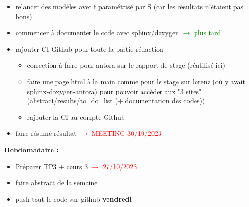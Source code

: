 \begin{itemize}[label=$\square$]
	\item[\done] relancer des modèles avec f paramétrisé par S (car les résultats n'étaient pas bons)
	\item[\wontfix] commencer à documenter le code avec sphinx/doxygen  \textcolor{Green}{$\rightarrow$ plus tard}
	\item[\done] rajouter CI Github pour toute la partie rédaction
	\begin{itemize}[label=\LARGE $\circ$]
		\item[\sdone] correction à faire pour antora sur le rapport de stage (réutilisé ici)
		\item[\swontfix] faire une page html à la main comme pour le stage sur lorenz (où y avait sphinx-doxygen-antora) pour pouvoir accèder aux "3 sites" (abstract/results/to\_do\_list (+ documentation des codes))
		\item[\sdone] rajouter la CI au compte Github
	\end{itemize}
	\item[\done] faire résumé résultat \textcolor{red}{$\rightarrow$ MEETING 30/10/2023}
\end{itemize}
\textbf{Hebdomadaire :}
\begin{itemize}[label=$\square$] 
	\item[\done] Préparer TP3 + cours 3 \textcolor{red}{$\rightarrow$ 27/10/2023}
	\item[\done] faire abstract de la semaine 
	\item[\done] push tout le code sur github \textbf{vendredi}
\end{itemize}